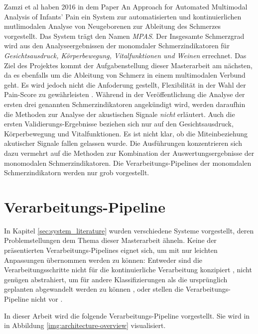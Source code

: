 Zamzi et al  haben 2016 in dem Paper \glqq An Approach for Automated Multimodal Analysis of Infants' Pain\grqq{} \cite{zamziMultimodal} ein System zur automatisierten und kontinuierlichen mutlimodalen Analyse von Neugeborenen zur Ableitung des Schmerzes vorgestellt. Das System trägt den Namen \emph{MPAS}. Der Insgesamte Schmerzgrad wird aus den Analyseergebnissen der monomdaler Schmerzindikatoren für \emph{Gesichtsausdruck, Körperbewegung, Vitalfunktionen und Weinen} errechnet. Das Ziel des Projektes kommt der Aufgabenstellung dieser Masterarbeit am nächsten, da es ebenfalls um die Ableitung von Schmerz in einem multimodalen Verbund geht. Es wird jedoch nicht die Anfoderung gestellt, Flexibilität in der Wahl der Pain-Score zu gewährleisten . Während in der Veröffentlichung die Analyse der ersten drei genannten Schmerzindikatoren angekündigt wird, werden daraufhin die Methoden zur Analyse der akustischen Signale \emph{nicht} erläutert. Auch die ersten Validierungs-Ergebnisse beziehen sich nur auf den Gesichtsausdruck, Körperbewegung und Vitalfunktionen. Es ist nicht klar, ob die Miteinbeziehung akutischer Signale fallen gelassen wurde. Die Ausführungen konzentrieren sich dazu vermehrt auf die Methoden zur Kombination der Auswertungsergebnisse der monomodalen Schmerzindikatoren. Die Verarbeitungs-Pipelines der monomdalen Schmerzindikatorn werden nur grob vorgestellt.

\section{Verarbeitungs-Pipeline}

In Kapitel \ref{sec:system_literature} wurden verschiedene Systeme vorgestellt, deren Problemstellungen dem Thema dieser Masterarbeit ähneln. Keine der präsentierten Verarbeitungs-Pipelines eignet sich, um mit nur leichten Anpassungen übernommen werden zu können: Entweder sind die Verarbeitungsschritte nicht für die kontinuierliche Verarbeitung konzipiert \cite{class_abdulaziz} \cite{comparisonOfLearning} \cite{cry_thesis}, nicht genügen abstrahiert, um für andere Klassifizierungen als die ursprünglich geplanten abgewandelt werden zu können \cite{cohenCry}, oder stellen die Verarbeitungs-Pipeline nicht vor \cite{palEmotion} \cite{zamziMultimodal}.

In dieser Arbeit wird die folgende Verarbeitungs-Pipeline vorgestellt. Sie wird in in Abbildung \ref{img:architecture-overview} visualisiert. 

